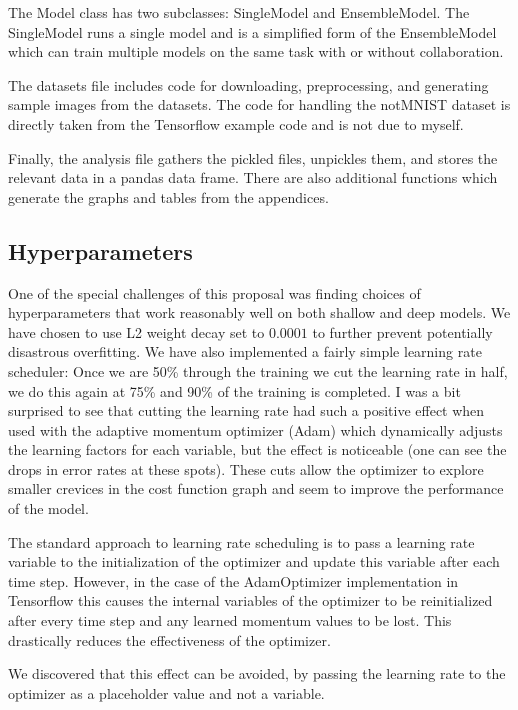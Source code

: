 \documentclass[english,a4paper,oneside]{amsart}
\theoremstyle{definition}
\begin{document}
The Model class has two subclasses: SingleModel and EnsembleModel. The SingleModel runs a single model and is a simplified form of the EnsembleModel which can train multiple models on the same task with or without collaboration. 

The datasets file includes code for downloading, preprocessing, and generating sample images from the datasets. The code for handling the notMNIST dataset is directly taken from the Tensorflow example code and is not due to myself. 

Finally, the analysis file gathers the pickled files, unpickles them, and stores the relevant data in a pandas data frame. There are also additional functions which generate the graphs and tables from the appendices.

\subsection{Hyperparameters}
One of the special challenges of this proposal was finding choices of hyperparameters that work reasonably well on both shallow and deep models. We have chosen to use L2 weight decay set to $0.0001$ to further prevent potentially disastrous overfitting. We have also implemented a fairly simple learning rate scheduler: Once we are 50\% through the training we cut the learning rate in half, we do this again at 75\% and 90\% of the training is completed. I was a bit surprised to see that cutting the learning rate had such a positive effect when used with the adaptive momentum optimizer (Adam) which dynamically adjusts the learning factors for each variable, but the effect is noticeable (one can see the drops in error rates at these spots). These cuts allow the optimizer to explore smaller crevices in the cost function graph and seem to improve the performance of the model.

\begin{remark}
	The standard approach to learning rate scheduling is to pass a learning rate variable to the initialization of the optimizer and update this variable after each time step. However, in the case of the AdamOptimizer implementation in Tensorflow this causes the internal variables of the optimizer to be reinitialized after every time step and any learned momentum values to be lost. This drastically reduces the effectiveness of the optimizer. 

	We discovered that this effect can be avoided, by passing the learning rate to the optimizer as a placeholder value and not a variable.
\end{remark}
\end{document}
